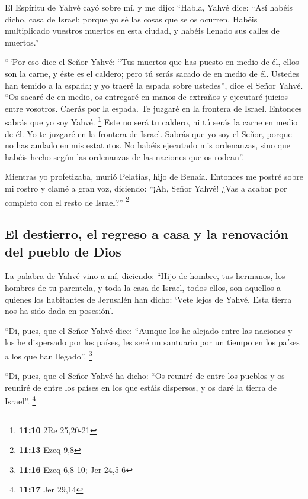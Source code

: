 \begin{paracol}{2}
 El Espíritu de Yahvé cayó sobre mí, y me dijo: ``Habla,
Yahvé dice: ``Así habéis dicho, casa de Israel; porque yo sé las cosas
que se os ocurren.  Habéis multiplicado vuestros muertos
en esta ciudad, y habéis llenado sus calles de muertos.''

 ``\,`Por eso dice el Señor Yahvé: ``Tus muertos que has
puesto en medio de él, ellos son la carne, y éste es el caldero; pero tú
serás sacado de en medio de él.  Ustedes han temido a la
espada; y yo traeré la espada sobre ustedes'', dice el Señor Yahvé.
 ``Os sacaré de en medio, os entregaré en manos de
extraños y ejecutaré juicios entre vosotros.  Caerás por
la espada. Te juzgaré en la frontera de Israel. Entonces sabrás que yo
soy Yahvé. \footnote{\textbf{11:10} 2Re 25,20-21}  Este
no será tu caldero, ni tú serás la carne en medio de él. Yo te juzgaré
en la frontera de Israel.  Sabrás que yo soy el Señor,
porque no has andado en mis estatutos. No habéis ejecutado mis
ordenanzas, sino que habéis hecho según las ordenanzas de las naciones
que os rodean''.

 Mientras yo profetizaba, murió Pelatías, hijo de Benaía.
Entonces me postré sobre mi rostro y clamé a gran voz, diciendo: ``¡Ah,
Señor Yahvé! ¿Vas a acabar por completo con el resto de Israel?''
\footnote{\textbf{11:13} Ezeq 9,8}

\hypertarget{el-destierro-el-regreso-a-casa-y-la-renovaciuxf3n-del-pueblo-de-dios}{%
\subsection{El destierro, el regreso a casa y la renovación del pueblo
de
Dios}\label{el-destierro-el-regreso-a-casa-y-la-renovaciuxf3n-del-pueblo-de-dios}}

 La palabra de Yahvé vino a mí, diciendo: 
``Hijo de hombre, tus hermanos, los hombres de tu parentela, y toda la
casa de Israel, todos ellos, son aquellos a quienes los habitantes de
Jerusalén han dicho: `Vete lejos de Yahvé. Esta tierra nos ha sido dada
en posesión'.

 ``Di, pues, que el Señor Yahvé dice: ``Aunque los he
alejado entre las naciones y los he dispersado por los países, les seré
un santuario por un tiempo en los países a los que han llegado''.
\footnote{\textbf{11:16} Ezeq 6,8-10; Jer 24,5-6}

 ``Di, pues, que el Señor Yahvé ha dicho: ``Os reuniré de
entre los pueblos y os reuniré de entre los países en los que estáis
dispersos, y os daré la tierra de Israel''. \footnote{\textbf{11:17} Jer
  29,14}


\end{paracol}
